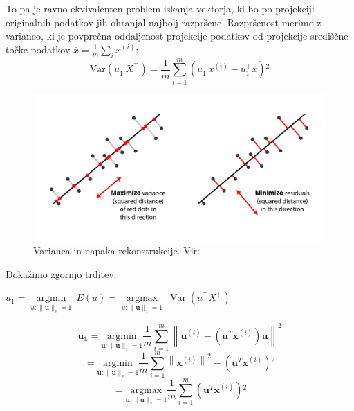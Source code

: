 To pa je ravno ekvivalenten problem iskanja vektorja, ki bo po projekciji originalnih podatkov jih ohranjal najbolj razpršene. Razpršenost merimo z varianco, ki je povprečna oddaljenost projekcije podatkov od projekcije središčne točke podatkov $\bar{x} = \frac{1}{m} \sum_{i} x^{(i)}$:
\begin{equation}
    \mathrm{Var}(u_1^{\top}X^{\top}) = \frac{1}{m} \sum_{i=1}^{m} \left(u_1^{\top}x^{(i)} - u_1^{\top}\bar{x}\right){}^2
\end{equation}
\begin{figure}[H]
    \centering
    \includegraphics[width=1\linewidth]{resources/pcaDvaPogleda.png}
    \caption{Varianca in napaka rekonstrukcije. Vir:~\cite{quora_pca_explanation}}\label{fig:varerr}
\end{figure}

Dokažimo zgornjo trditev.
\begin{trditev}
    $u_{1} = \underset{u:\|\mathbf{u}\|_2=1}{\operatorname{argmin}}\ E(u) = \underset{u:\|\mathbf{u}\|_2=1}{\operatorname{argmax}}\ \operatorname{Var}(u^{\top}X^{\top})$
\end{trditev}
\begin{dokaz}
    \begin{equation}
\mathbf{u_{1}} = \underset{\mathbf{u}:\|\mathbf{u}\|_2=1}{\mathrm{argmin}} \frac{1}{m} \sum_{i=1}^{m} \left\| \mathbf{u}^{(i)} - (\mathbf{u}^T \mathbf{x}^{(i)})\mathbf{u} \right\|^2
\end{equation}
\begin{equation}
= \underset{\mathbf{u}:\|\mathbf{u}\|_2=1}{\mathrm{argmin}} \frac{1}{m} \sum_{i=1}^{m} \left\| \mathbf{x}^{(i)} \right\|^2 - (\mathbf{u}^T \mathbf{x}^{(i)}){}^2
\end{equation}
\begin{equation}
= \underset{\mathbf{u}:\|\mathbf{u}\|_2=1}{\mathrm{argmax}} \frac{1}{m} \sum_{i=1}^{m} (\mathbf{u}^T \mathbf{x}^{(i)}){}^2
\end{equation}
\end{dokaz}~\cite{gormley2018pca} \\
